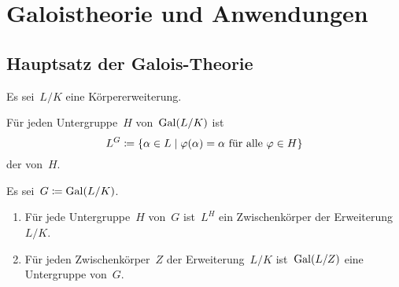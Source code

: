 \chapter{Galoistheorie und Anwendungen}





\section{Hauptsatz der Galois-Theorie}

\begin{convention}
  Es sei~$L/K$ eine Körpererweiterung.
\end{convention}


\begin{definition}
  Für jeden Untergruppe~$H$ von~$\operatorname{Gal}(L/K)$ ist
  \[
    L^G
    \defined
    \{
      \alpha \in L
    \suchthat
      \text{$\varphi(\alpha) = \alpha$ für alle~$\varphi \in H$}
    \}
  \]
  der  von~$H$.
\end{definition}

\begin{lemma}
  Es sei~$G \coloneqq \operatorname{Gal}(L/K)$.
  \begin{enumerate}
    \item
      Für jede Untergruppe~$H$ von~$G$ ist~$L^H$ ein Zwischenkörper der Erweiterung~$L/K$.
    \item
      Für jeden Zwischenkörper~$Z$ der Erweiterung~$L/K$ ist~$\operatorname{Gal}(L/Z)$ eine Untergruppe von~$G$.
  \end{enumerate}
\end{lemma}

